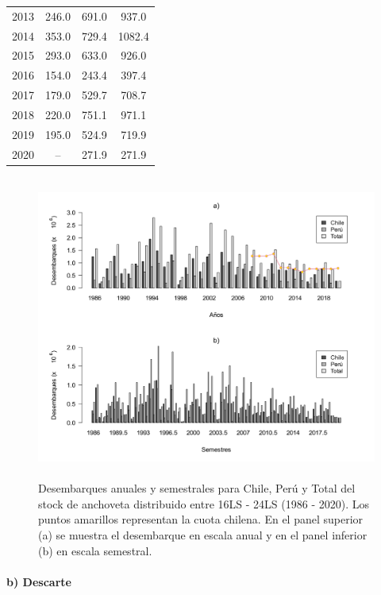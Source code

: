 \documentclass[letter,11pt]{article}
\begin{document}
\begin{table}[htb!]
\begin{tabular}{cccc}
 2013  &  246.0  &   691.0  &   937.0  \\
 2014  &  353.0  &   729.4  &  1082.4  \\
 2015  &  293.0  &   633.0  &   926.0  \\
 2016  &  154.0  &   243.4  &   397.4  \\
 2017  &  179.0  &   529.7  &   708.7  \\
 2018  &  220.0  &   751.1  &   971.1  \\
 2019  &  195.0  &   524.9  &   719.9  \\
 2020  &  \---   &   271.9  &   271.9  \\
 \hline
 \end{tabular}
\end{table}

\vspace{0.5cm}
\vspace{0.5cm}
\begin{figure}[htb!]
 \centering
 \includegraphics[width=17cm,height=10cm]{Figuras/figura11.pdf}
 \caption{Desembarques anuales y semestrales para Chile, Per\'u y Total del stock de anchoveta distribuido entre 16\degree LS - 24\degree LS (1986 - 2020). Los puntos amarillos representan la cuota chilena. En el panel superior (a) se muestra el desembarque en escala anual y en el panel inferior (b) en escala semestral.}
 \label{Fig11}
\end{figure}


\paragraph{b) Descarte}
\end{document}
